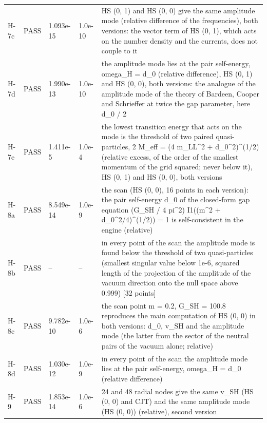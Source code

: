\documentclass[aps,prd,onecolumn,superscriptaddress,nofootinbib,floatfix,longbibliography]{revtex4-2}
\begin{document}
\begin{longtable}{p{}p{}p{}p{}p{}}
H-7c & PASS & 1.093e-15 & 1.0e-10 & HS (0, 1) and HS (0, 0) give the same amplitude mode (relative difference of the frequencies), both versions: the vector term of HS (0, 1), which acts on the number density and the currents, does not couple to it \\
H-7d & PASS & 1.990e-13 & 1.0e-10 & the amplitude mode lies at the pair self-energy, omega\_H = d\_0 (relative difference), HS (0, 1) and HS (0, 0), both versions: the analogue of the amplitude mode of the theory of Bardeen, Cooper and Schrieffer at twice the gap parameter, here d\_0 / 2 \\
H-7e & PASS & 1.411e-5 & 1.0e-4 & the lowest transition energy that acts on the mode is the threshold of two paired quasi-particles, 2 M\_eff = (4 m\_LL\textasciicircum{}2 + d\_0\textasciicircum{}2)\textasciicircum{}(1/2) (relative excess, of the order of the smallest momentum of the grid squared; never below it), HS (0, 1) and HS (0, 0), both versions \\
H-8a & PASS & 8.549e-14 & 1.0e-9 & the scan (HS (0, 0), 16 points in each version): the pair self-energy d\_0 of the closed-form gap equation (G\_SH / 4 pi\textasciicircum{}2) I1((m\textasciicircum{}2 + d\_0\textasciicircum{}2/4)\textasciicircum{}(1/2)) = 1 is self-consistent in the engine (relative) \\
H-8b & PASS & -- & -- & in every point of the scan the amplitude mode is found below the threshold of two quasi-particles (smallest singular value below 1e-6, squared length of the projection of the amplitude of the vacuum direction onto the null space above 0.999) [32 points] \\
H-8c & PASS & 9.782e-10 & 1.0e-6 & the scan point m = 0.2, G\_SH = 100.8 reproduces the main computation of HS (0, 0) in both versions: d\_0, v\_SH and the amplitude mode (the latter from the sector of the neutral pairs of the vacuum alone; relative) \\
H-8d & PASS & 1.030e-12 & 1.0e-9 & in every point of the scan the amplitude mode lies at the pair self-energy, omega\_H = d\_0 (relative difference) \\
H-9 & PASS & 1.853e-14 & 1.0e-6 & 24 and 48 radial nodes give the same v\_SH (HS (0, 0) and CJT) and the same amplitude mode (HS (0, 0)) (relative), second version \\
\end{longtable}
\endgroup
\end{document}
